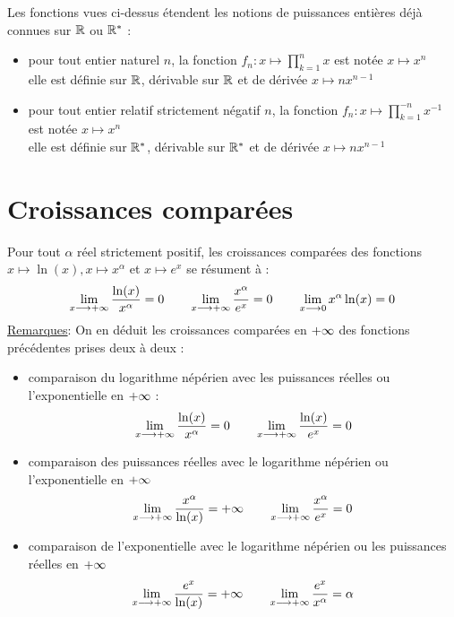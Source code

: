 \begin{defprop}
    Les fonctions vues ci-dessus étendent les notions de puissances entières déjà connues sur \(\mathbb{R}\) ou \(\mathbb{R}^*\) :
    \begin{itemize}
        \item pour tout entier naturel \(n\), la fonction \(f_n : x\mapsto \prod_{k=1}^{n}x\) est notée \(x\mapsto x^n\)\\
        elle est définie sur \(\mathbb{R}\), dérivable sur \(\mathbb{R}\) et de dérivée \(x\mapsto nx^{n-1}\)
        \item pour tout entier relatif strictement négatif \(n\), la fonction \(f_n : x\mapsto \prod_{k=1}^{-n}x^{-1}\) est notée \(x\mapsto x^n\)\\
        elle est définie sur \(\mathbb{R}^*\), dérivable sur \(\mathbb{R}^*\) et de dérivée \(x\mapsto nx^{n-1}\)
    \end{itemize}
\end{defprop}

\section{Croissances comparées}
\begin{defprop}
    Pour tout \(\alpha\) réel strictement positif, les croissances comparées des fonctions \(x \mapsto \ln (x), x \mapsto x^{\alpha}\) et \(x \mapsto e^x\) se résument à : 
    \[\lim_{x\longrightarrow+\infty} \frac{\ln(x)}{x^{\alpha}} = 0 \qquad \lim_{x\longrightarrow+\infty} \frac{x^{\alpha}}{e^x} = 0 \qquad \lim_{x\longrightarrow 0} x^{\alpha} \ln(x) = 0\]
    \underline{Remarques}:
    On en déduit les croissances comparées en \(+\infty\) des fonctions précédentes prises deux à deux :
    \begin{itemize}
        \item comparaison du logarithme népérien avec les puissances réelles ou l’exponentielle en \(+\infty\) :
        \[\lim_{x\longrightarrow+\infty} \frac{\ln(x)}{x^{\alpha}} = 0 \qquad \lim_{x\longrightarrow+\infty} \frac{\ln(x)}{e^x} = 0\]
        \item comparaison des puissances réelles avec le logarithme népérien ou l’exponentielle en \(+\infty\)
        \[\lim_{x\longrightarrow+\infty} \frac{x^{\alpha}}{\ln(x)} = +\infty \qquad \lim_{x\longrightarrow+\infty} \frac{x^{\alpha}}{e^x} = 0\]
        \item comparaison de l’exponentielle avec le logarithme népérien ou les puissances réelles en \(+\infty\)
        \[\lim_{x\longrightarrow+\infty} \frac{e^x}{\ln(x)} = +\infty \qquad \lim_{x\longrightarrow+\infty} \frac{e^x}{x^{\alpha}} = \alpha\]
    
    \end{itemize}
\end{defprop}

